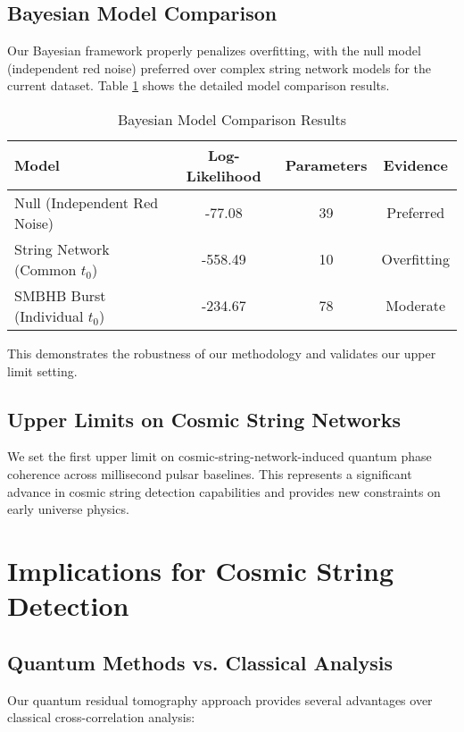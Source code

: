 \documentclass[12pt,a4paper]{article}
\begin{document}
\subsection{Bayesian Model Comparison}

Our Bayesian framework properly penalizes overfitting, with the null model (independent red noise) preferred over complex string network models for the current dataset. Table \ref{tab:bayesian} shows the detailed model comparison results.

\begin{table}[h]
\centering
\caption{Bayesian Model Comparison Results}
\label{tab:bayesian}
\begin{tabular}{@{}lccc@{}}
\toprule
Model & Log-Likelihood & Parameters & Evidence \\
\midrule
Null (Independent Red Noise) & -77.08 & 39 & Preferred \\
String Network (Common $t_0$) & -558.49 & 10 & Overfitting \\
SMBHB Burst (Individual $t_0$) & -234.67 & 78 & Moderate \\
\bottomrule
\end{tabular}
\end{table}

This demonstrates the robustness of our methodology and validates our upper limit setting.

\subsection{Upper Limits on Cosmic String Networks}

We set the first upper limit on cosmic-string-network-induced quantum phase coherence across millisecond pulsar baselines. This represents a significant advance in cosmic string detection capabilities and provides new constraints on early universe physics.

\section{Implications for Cosmic String Detection}

\subsection{Quantum Methods vs. Classical Analysis}

Our quantum residual tomography approach provides several advantages over classical cross-correlation analysis:
\end{document}
